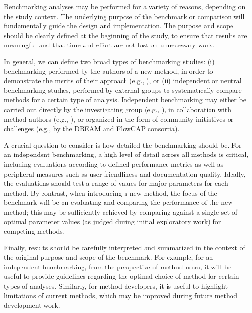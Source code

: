 \documentclass[12pt, a4paper]{article}
\begin{document}
Benchmarking analyses may be performed for a variety of reasons, depending on the study context. The underlying purpose of the benchmark or comparison will fundamentally guide the design and implementation. The purpose and scope should be clearly defined at the beginning of the study, to ensure that results are meaningful and that time and effort are not lost on unnecessary work.

In general, we can define two broad types of benchmarking studies: (i) benchmarking performed by the authors of a new method, in order to demonstrate the merits of their approach (e.g., \citep{Weber2018, Nowicka2016, Levine2015, Zhou2014, Law2014}), or (ii) independent or neutral benchmarking studies, performed by external groups to systematically compare methods for a certain type of analysis. Independent benchmarking may either be carried out directly by the investigating group (e.g., \citep{Duo2018, Saelens2018a, Saelens2018b, Soneson2018, Weber2016, Baruzzo2017, Kanitz2015, Soneson2013, Rapaport2013, Dillies2012}), in collaboration with method authors (e.g., \citep{Sage2015}), or organized in the form of community initiatives or challenges (e.g., by the DREAM \citep{Weirauch2013, Costello2014, Kuffner2015, Ewing2015, Hill2016} and FlowCAP \citep{Aghaeepour2013, Aghaeepour2016} consortia).

A crucial question to consider is how detailed the benchmarking should be. For an independent benchmarking, a high level of detail across all methods is critical, including evaluations according to defined performance metrics as well as peripheral measures such as user-friendliness and documentation quality. Ideally, the evaluations should test a range of values for major parameters for each method. By contrast, when introducing a new method, the focus of the benchmark will be on evaluating and comparing the performance of the new method; this may be sufficiently achieved by comparing against a single set of optimal parameter values (as judged during initial exploratory work) for competing methods.

Finally, results should be carefully interpreted and summarized in the context of the original purpose and scope of the benchmark. For example, for an independent benchmarking, from the perspective of method users, it will be useful to provide guidelines regarding the optimal choice of method for certain types of analyses. Similarly, for method developers, it is useful to highlight limitations of current methods, which may be improved during future method development work.
\end{document}
